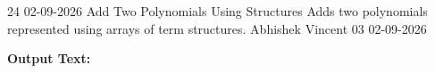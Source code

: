 \clearpage
\label{prog:24}
\programhead
  {24}
  {02-09-2026}
  {Add Two Polynomials Using Structures}
  {Adds two polynomials represented using arrays of term structures.}
  {Abhishek Vincent}
  {03}
  {02-09-2026}

\divider
\textbf{Output Text:}\par
\vspace{2pt}

